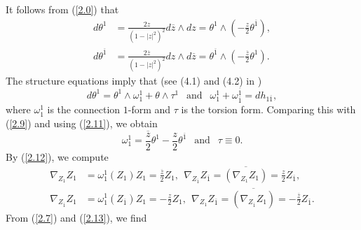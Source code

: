 \documentclass{amsart}
\theoremstyle{Corollary}
\numberwithin{equation}{section}
\begin{document}
It follows from (\ref{2.0}) that 
\begin{equation}\label{2.9}
\begin{split}
d\theta^1&=\frac{2z}{(1-|z|^2)^2}d\overline{z}\wedge dz=\theta^1\wedge\left(-\frac{z}{2}\theta^{\overline{1}}\right),\\
d\theta^{\overline{1}}&=\frac{2\overline{z}}{(1-|z|^2)^2}dz\wedge d\overline{z}
=\theta^{\overline{1}}\wedge\left(-\frac{\overline{z}}{2}\theta^1\right).
\end{split}
\end{equation}
The structure equations imply that (see (4.1) and (4.2) in \cite{Lee})
\begin{equation}\label{2.10}
d\theta^1=\theta^1\wedge\omega_1^1+\theta\wedge\tau^1~~
\mbox{ and }~~\omega_1^1+\omega_{\overline{1}}^{\overline{1}}=dh_{1\overline{1}},
\end{equation}
where $\omega_1^1$ is the connection $1$-form and $\tau$ is the torsion form. 
Comparing this with (\ref{2.9}) and using (\ref{2.11}), we obtain 
\begin{equation}\label{2.12}
\omega_1^1=\frac{\overline{z}}{2}\theta^1-\frac{z}{2}\theta^{\overline{1}}~~
\mbox{ and }~~\tau\equiv 0.
\end{equation}
By (\ref{2.12}), we compute
\begin{equation}\label{2.13}
\begin{split}
\nabla_{Z_1}Z_1&=\omega_1^1(Z_1)Z_1=\frac{\overline{z}}{2}Z_1,~~
\nabla_{Z_{\overline{1}}}Z_{\overline{1}}=\overline{(\nabla_{Z_1}Z_1)}=\frac{z}{2}Z_{\overline{1}},\\
\nabla_{Z_{\overline{1}}}Z_1&=\omega_1^1(Z_{\overline{1}})Z_1=-\frac{z}{2}Z_1,~~
\nabla_{Z_1}Z_{\overline{1}}=\overline{(\nabla_{Z_{\overline{1}}}Z_1)}=-\frac{\overline{z}}{2}Z_{\overline{1}}.
\end{split}
\end{equation}
From (\ref{2.7}) and (\ref{2.13}), we find
\end{document}
